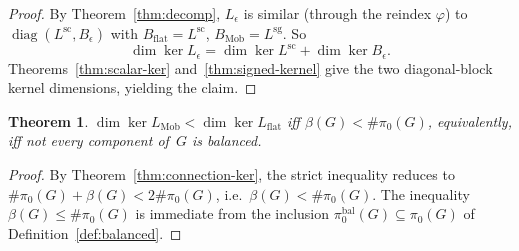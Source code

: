\documentclass[11pt,a4paper]{amsart}
\theoremstyle{plain}
\newtheorem{theorem}{Theorem}[section]
\theoremstyle{definition}
\theoremstyle{remark}
\DeclareMathOperator{\Ker}{ker}
\DeclareMathOperator{\diag}{diag}
\newcommand{\Lscalar}{L^{\operatorname{sc}}}
\newcommand{\Lsigned}{L^{\operatorname{sg}}}
\newcommand{\comp}{\pi_0}
\begin{document}
\begin{proof}
By Theorem~\ref{thm:decomp}, $L_\epsilon$ is similar (through the
reindex $\varphi$) to
$\diag(\Lscalar, B_\epsilon)$ with
$B_{\mathrm{flat}}=\Lscalar$, $B_{\mathrm{Mob}}=\Lsigned$. So
\[
  \dim\Ker L_\epsilon
  = \dim\Ker\Lscalar + \dim \Ker B_\epsilon.
\]
Theorems~\ref{thm:scalar-ker} and~\ref{thm:signed-kernel} give the
two diagonal-block kernel dimensions, yielding the claim.
\end{proof}

\begin{theorem}\label{thm:strict}
$\dim\Ker L_{\mathrm{Mob}} < \dim\Ker L_{\mathrm{flat}}$
  iff $\beta(G) < \#\comp(G)$, equivalently, iff \emph{not every}
  component of~$G$ is balanced.
\end{theorem}

\begin{proof}
By Theorem~\ref{thm:connection-ker}, the strict inequality reduces
to $\#\comp(G)+\beta(G) < 2\#\comp(G)$, i.e.\ $\beta(G)<\#\comp(G)$.
The inequality $\beta(G)\le \#\comp(G)$ is immediate from the
inclusion $\comp^{\mathrm{bal}}(G)\subseteq\comp(G)$ of
Definition~\ref{def:balanced}.
\end{proof}
\end{document}
